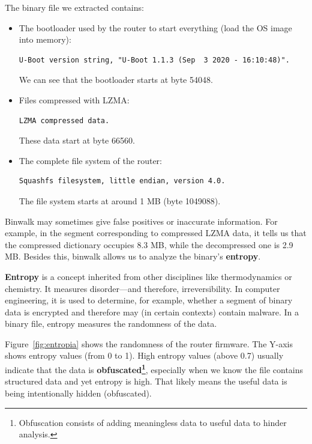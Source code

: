 \documentclass[12pt,a4paper, brazil]{article}
\begin{document}
The binary file we extracted contains:
\begin{itemize}
    \item The bootloader used by the router to start everything (load the OS image into memory):
    \begin{tcolorbox}[colback=red!10]
            \begin{verbatim}
U-Boot version string, "U-Boot 1.1.3 (Sep  3 2020 - 16:10:48)".
            \end{verbatim}
    \end{tcolorbox}
    We can see that the bootloader starts at byte 54048.
    
    \item Files compressed with LZMA:
    \begin{tcolorbox}[colback=red!10]
            \begin{verbatim}
LZMA compressed data.
            \end{verbatim}
    \end{tcolorbox}
    These data start at byte 66560.
    
    \item The complete file system of the router:
    \begin{tcolorbox}[colback=red!10]
            \begin{verbatim}
Squashfs filesystem, little endian, version 4.0.
            \end{verbatim}
    \end{tcolorbox}
    The file system starts at around 1 MB (byte 1049088).
\end{itemize}

Binwalk may sometimes give false positives or inaccurate information. For example, in the segment corresponding to compressed LZMA data, it tells us that the compressed dictionary occupies 8.3 MB, while the decompressed one is 2.9 MB. Besides this, binwalk allows us to analyze the binary’s \textbf{entropy}.

\begin{tcolorbox}[colback=green!10]
    \textbf{Entropy} is a concept inherited from other disciplines like thermodynamics or chemistry. It measures disorder—and therefore, irreversibility. In computer engineering, it is used to determine, for example, whether a segment of binary data is encrypted and therefore may (in certain contexts) contain malware. In a binary file, entropy measures the randomness of the data.
\end{tcolorbox}

Figure~\ref{fig:entropia} shows the randomness of the router firmware. The Y-axis shows entropy values (from 0 to 1). High entropy values (above 0.7) usually indicate that the data is \textbf{obfuscated\footnote{Obfuscation consists of adding meaningless data to useful data to hinder analysis.}}, especially when we know the file contains structured data and yet entropy is high. That likely means the useful data is being intentionally hidden (obfuscated).
\end{document}
